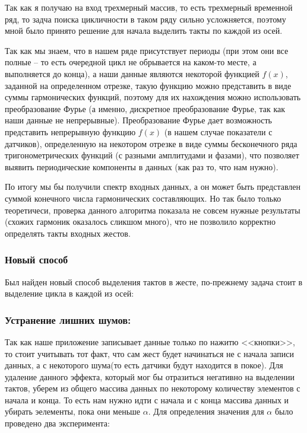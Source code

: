 Так как я получаю на вход трехмерный массив, то есть трехмерный временной ряд, то задча поиска цикличности в таком ряду сильно усложняется, поэтому мной было принято решение для начала выделить такты по каждой из осей.

Так как мы знаем, что в нашем ряде присутствует периоды (при этом они все полные – то есть очередной цикл не обрывается на каком-то месте, а выполняется до конца), а наши данные являются некоторой функцией $f(x)$, заданной на определенном отрезке, такую функцию можно представить в виде суммы гармонических функций, поэтому для их нахождения можно использовать преобразование Фурье (а именно, дискретное преобразование Фурье, так как наши данные не непрерывные). Преобразование Фурье
дает возможность представить непрерывную функцию $f(x)$ (в нашем случае показатели с датчиков), определенную на некотором отрезке в виде суммы бесконечного ряда тригонометрических функций (с разными амплитудами и фазами), что позволяет выявить периодические компоненты в данных (как раз то, что нам нужно).

По итогу мы бы получили спектр входных данных, а он может быть представлен суммой конечного числа гармонических составляющих. Но так было только теоретичеси, проверка данного алгоритма показала не совсем нужные результаты (схожих гармоник оказалось сликшом много), что не позволило корректно определять такты входных жестов.

\subsubsection{Новый способ}
Был найден новый способ выделения тактов в жесте, по-прежнему задача стоит в выделение цикла в каждой из осей:
\subsubsection{Устранение лишних шумов:}
Так как наше приложение записывает данные только по нажитю <<кнопки>>, то стоит учитывать тот факт, что сам жест будет начинаться не с начала записи данных, а с некоторого шума(то есть датчики будут находится в покое). Для удаление данного эффекта, который мог бы отразиться негативно на выделении тактов, уберем из общего массива данных по некоторому количеству элементов с начала и конца. То есть нам нужно идти с начала и с конца массива данных и убирать эелементы, пока они меньше $\alpha$. Для определения значения для $\alpha$ было проведено два эксперимента:

